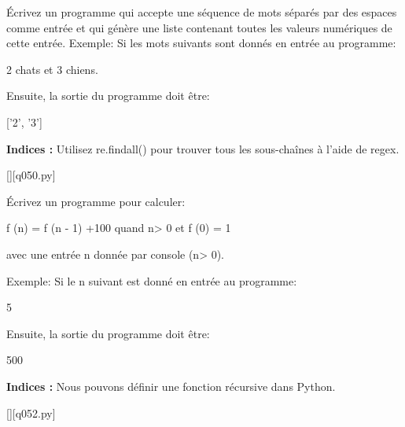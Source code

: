 \question
Écrivez un programme qui accepte une séquence de mots séparés par des espaces comme entrée et qui génère une liste contenant toutes les valeurs numériques de cette entrée.\newline
Exemple:\newline
Si les mots suivants sont donnés en entrée au programme:\newline

2 chats et 3 chiens.\newline

Ensuite, la sortie du programme doit être:\newline

['2', '3']\newline

\par
\textbf{Indices : }Utilisez re.findall() pour trouver tous les sous-chaînes à l'aide de regex.
\renewcommand{\nomfichier}{q050.py}
\begin{solution}
    \pythonfile{\chemincode \nomfichier}[][\nomfichier]
\end{solution}


\question
Écrivez un programme pour calculer:

f (n) = f (n - 1) +100 quand n> 0\newline
et f (0) = 1\newline

avec une entrée n donnée par console (n> 0).

Exemple:\newline
Si le n suivant est donné en entrée au programme:\newline

5

Ensuite, la sortie du programme doit être:\newline

500

\par
\textbf{Indices : }Nous pouvons définir une fonction récursive dans Python.
\renewcommand{\nomfichier}{q052.py}
\begin{solution}
    \pythonfile{\chemincode \nomfichier}[][\nomfichier]
\end{solution}

